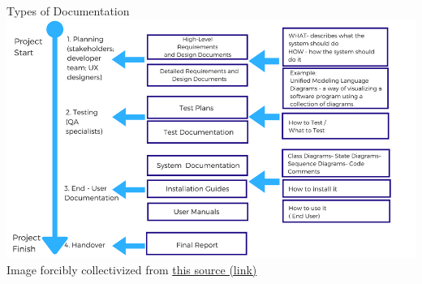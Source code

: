 \documentclass[11pt]{beamer}
\begin{document}
\begin{frame}{Types of Documentation}
\center
\includegraphics[scale=0.3]{documentation.png} \\
{\tiny Image forcibly collectivized from \href{https://blog.prototypr.io/software-documentation-types-and-best-practices-1726ca595c7f}{this source (link)}}
\end{frame}
\end{document}
